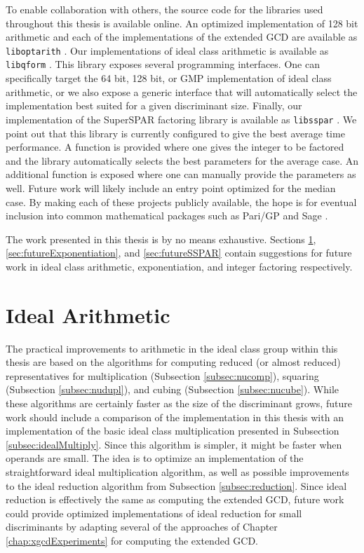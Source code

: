 \documentclass{ucalgthes1}
\theoremstyle{definition}
\begin{document}
To enable collaboration with others, the source code for the libraries used throughout this thesis is available online.  An optimized implementation of 128 bit arithmetic and each of the implementations of the extended GCD are available as \texttt{liboptarith} \cite{liboptarith}.  Our implementations of ideal class arithmetic is available as \texttt{libqform} \cite{libqform}.  This library exposes several programming interfaces.  One can specifically target the 64 bit, 128 bit, or GMP implementation of ideal class arithmetic, or we also expose a generic interface that will automatically select the implementation best suited for a given discriminant size.  Finally, our implementation of the SuperSPAR factoring library is available as \texttt{libsspar} \cite{libsspar}.  We point out that this library is currently configured to give the best average time performance.  A function is provided where one gives the integer to be factored and the library automatically selects the best parameters for the average case.  An additional function is exposed where one can manually provide the parameters as well.  Future work will likely include an entry point optimized for the median case.   By making each of these projects publicly available, the hope is for eventual inclusion into common mathematical packages such as Pari/GP \cite{PariGP} and Sage \cite{Sage}.

The work presented in this thesis is by no means exhaustive.  Sections \ref{sec:futureIdealArithmetic}, \ref{sec:futureExponentiation}, and \ref{sec:futureSSPAR} contain suggestions for future work in ideal class arithmetic, exponentiation, and integer factoring respectively.

\section{Ideal Arithmetic}
\label{sec:futureIdealArithmetic}

The practical improvements to arithmetic in the ideal class group within this thesis are based on the algorithms for computing reduced (or almost reduced) representatives for multiplication (Subsection \ref{subsec:nucomp}), squaring (Subsection \ref{subsec:nudupl}), and cubing (Subsection \ref{subsec:nucube}).  While these algorithms are certainly faster as the size of the discriminant grows, future work should include a comparison of the implementation in this thesis with an implementation of the basic ideal class multiplication presented in Subsection \ref{subsec:idealMultiply}.  Since this algorithm is simpler, it might be faster when operands are small.  The idea is to optimize an implementation of the straightforward ideal multiplication algorithm, as well as possible improvements to the ideal reduction algorithm from Subsection \ref{subsec:reduction}.  Since ideal reduction is effectively the same as computing the extended GCD, future work could provide optimized implementations of ideal reduction for small discriminants by adapting several of the approaches of Chapter \ref{chap:xgcdExperiments} for computing the extended GCD.
\end{document}
